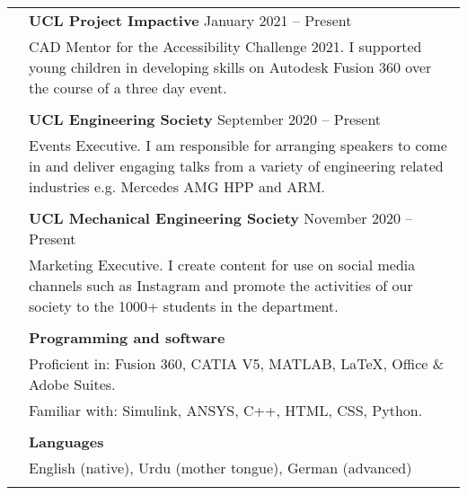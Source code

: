 \documentclass[letterpaper, 11pt]{article}
\begin{document}
\begin{longtable}{p{1.3in}p{4.8in}}

\color{OliveGreen}{Service and outreach}
& \textbf{UCL Project Impactive} \hfill January 2021 -- Present \\
& CAD Mentor for the Accessibility Challenge 2021. I supported young children in developing skills on Autodesk Fusion 360 over the course of a three day event. \\
& \\

& \textbf{UCL Engineering Society} \hfill September 2020 -- Present \\
& Events Executive. I am responsible for arranging speakers to come in and deliver engaging talks from a variety of engineering related industries e.g. Mercedes AMG HPP and ARM. \\
& \\

& \textbf{UCL Mechanical Engineering Society} \hfill November 2020 -- Present \\
& Marketing Executive. I create content for use on social media channels such as Instagram and promote the activities of our society to the 1000+ students in the department. \\
& \\




{\color{OliveGreen}{Skills}} 
& \textbf{Programming and software}\\
& Proficient in: Fusion 360, CATIA V5, MATLAB, \LaTeX, Office \& Adobe Suites. \\
& Familiar with: Simulink, ANSYS, C++, HTML, CSS, Python. \\
& \\

& \textbf{Languages} \\
& English (native), Urdu (mother tongue), German (advanced) \\
& \\


\end{longtable}
\end{document}
